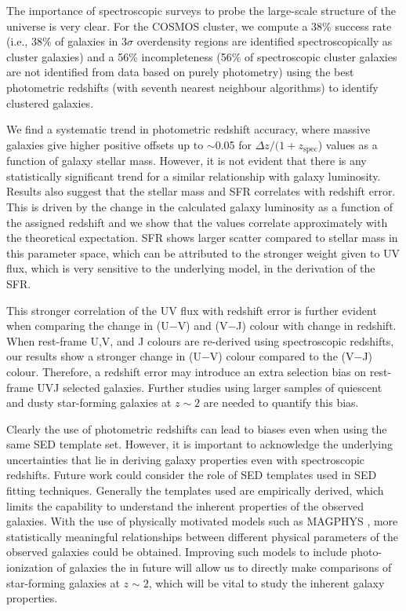 \documentclass[iop]{emulateapj}
\begin{document}
The importance of spectroscopic surveys to probe the large-scale structure of the universe is very clear. For the COSMOS \citet{Yuan2014} cluster, we compute a 38\% success rate (i.e., 38\% of galaxies in $3\sigma$ overdensity regions are identified spectroscopically as cluster galaxies) and a 56\% incompleteness (56\% of spectroscopic cluster galaxies are not identified from data based on purely photometry) using the best photometric redshifts (with seventh nearest neighbour algorithms) to identify clustered galaxies. 

We find a systematic trend in photometric redshift accuracy, where massive galaxies give higher positive offsets up to $\sim$0.05 for $\Delta z/(1+z_\mathrm{spec}$) values as a function of galaxy stellar mass. However, it is not evident that there is any statistically significant trend for a similar relationship with galaxy luminosity. 
Results also suggest that the stellar mass and SFR correlates with redshift error. This is driven by the change in the calculated galaxy luminosity as a function of the assigned redshift and we show that the values correlate approximately with the theoretical expectation. SFR shows larger scatter compared to stellar mass in this parameter space, which can be attributed to the stronger weight given to UV flux, which is very sensitive to the underlying model, in the derivation of the SFR. 


This stronger correlation of the UV flux with redshift error is further evident when comparing the change in (U$-$V) and (V$-$J) colour with change in redshift. When rest-frame U,V, and J colours are re-derived using spectroscopic redshifts, our results show a stronger change in (U$-$V) colour compared to the (V$-$J) colour. Therefore, a redshift error may introduce an extra selection bias on rest-frame UVJ selected galaxies.  Further studies using larger samples of quiescent and dusty star-forming galaxies at $z\sim2$ are needed to quantify this bias. 



Clearly the use of photometric redshifts can lead to biases even when using the same SED template set. However, it is important to acknowledge the underlying uncertainties that lie in deriving galaxy properties even with spectroscopic redshifts. 
Future work could consider the role of SED templates used in SED fitting techniques. Generally the templates used are empirically derived, which limits the capability to understand the inherent properties of the observed galaxies. With the use of physically motivated models such as MAGPHYS \citep{daCunha2008}, more statistically meaningful relationships between different physical parameters of the observed galaxies could be obtained. Improving such models to include photo-ionization of galaxies the in future will allow us to directly make comparisons of star-forming galaxies at $z\sim2$, which will be vital to study the inherent galaxy properties. 
\end{document}
